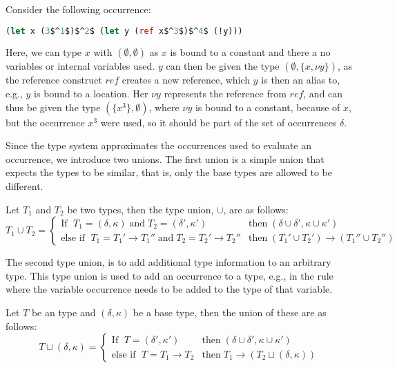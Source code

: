 \documentclass[acmsmall,sigplan]{acmart}
\begin{document}
\begin{example}[]
Consider the following occurrence:
\begin{lstlisting}[language=Caml, mathescape=true]
(let x (3$^1$)$^2$ (let y (ref x$^3$)$^4$ (!y)))
\end{lstlisting}
Here, we can type $x$ with $(\emptyset,\emptyset)$ as $x$ is bound to a constant and there a no variables or internal variables used.
$y$ can then be given the type $(\emptyset,\{x,\nu y\})$, as the reference construct $ref$ creates a new reference, which $y$ is then an alias to, e.g., $y$ is bound to a location.
Her $\nu y$ represents the reference from $ref$, and can thus be given the type $(\{x^3\},\emptyset)$, where $\nu y$ is bound to a constant, because of $x$, but the occurrence $x^3$ were used, so it should be part of the set of occurrences $\delta$.
\end{example}

Since the type system approximates the occurrences used to evaluate an occurrence, we introduce two unions.
The first union is a simple union that expects the types to be similar, that is, only the base types are allowed to be different.
\begin{definition}
	Let $T_1$ and $T_2$ be two types, then the type union, $\cup$, are as follows:
	\begin{equation*}
		T_1\cup T_2=
		\left\{\begin{matrix}
			\mbox{If } \; T_1=(\delta,\kappa) \;\mbox{and}\; T_2=(\delta',\kappa')  & \mbox{then} \; (\delta\cup\delta',\kappa\cup\kappa')\\
			\mbox{else if } \; T_1=T_1'\rightarrow T_1''\;\mbox{and}\;T_2=T_2'\rightarrow T_2'' & \mbox{then} \; (T_1'\cup T_2')\rightarrow (T_1''\cup T_2'')
		\end{matrix}\right.
	\end{equation*}
\end{definition}

The second type union, is to add additional type information to an arbitrary type.
This type union is used to add an occurrence to a type, e.g., in the  rule where the variable occurrence needs to be added to the type of that variable.
\begin{definition}
	Let $T$ be an type and $(\delta,\kappa)$ be a base type, then the union of these are as follows:
	\begin{equation*}
		T\sqcup (\delta,\kappa)=
		\left\{\begin{matrix}
			\mbox{If } \; T=(\delta',\kappa')  & \mbox{then} \; (\delta\cup\delta',\kappa\cup\kappa')\\
			\mbox{else if } \; T=T_1\rightarrow T_2 & \mbox{then} \; T_1\rightarrow(T_2\sqcup (\delta,\kappa))
		\end{matrix}\right.
	\end{equation*}
\end{definition}
\end{document}
